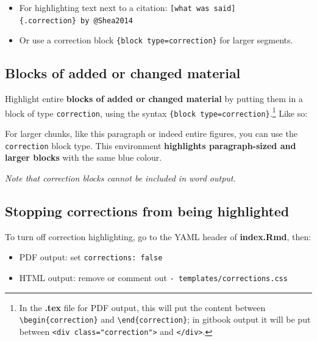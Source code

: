 \documentclass[a4paper, nobind]{templates/ociamthesis}
\providecommand{\tightlist}{%
  \setlength{\itemsep}{0pt}\setlength{\parskip}{0pt}}
\begin{document}
\begin{itemize}
\tightlist
\item
  For highlighting text next to a citation: \texttt{{[}what\ was\ said{]}\{.correction\}\ by\ @Shea2014}
\item
  Or use a correction block \texttt{\textasciigrave{}\textasciigrave{}\textasciigrave{}\{block\ type=\textquotesingle{}correction\textquotesingle{}\}} for larger segments.
\end{itemize}

\subsection{Blocks of added or changed material}\label{blocks-of-added-or-changed-material}

Highlight entire \textbf{blocks of added or changed material} by putting them in a block of type \texttt{correction}, using the syntax \texttt{\textasciigrave{}\textasciigrave{}\textasciigrave{}\{block\ type=\textquotesingle{}correction\textquotesingle{}\}}.\footnote{In the \textbf{.tex} file for PDF output, this will put the content between \texttt{\textbackslash{}begin\{correction\}} and \texttt{\textbackslash{}end\{correction\}}; in gitbook output it will be put between \texttt{\textless{}div\ class="correction"\textgreater{}} and \texttt{\textless{}/div\textgreater{}}.}
Like so:

\begin{correction}
For larger chunks, like this paragraph or indeed entire figures, you can
use the \texttt{correction} block type. This environment
\textbf{highlights paragraph-sized and larger blocks} with the same blue
colour.
\end{correction}

\emph{Note that correction blocks cannot be included in word output.}

\subsection{Stopping corrections from being highlighted}\label{stopping-corrections-from-being-highlighted}

To turn off correction highlighting, go to the YAML header of \textbf{index.Rmd}, then:

\begin{itemize}
\tightlist
\item
  PDF output: set \texttt{corrections:\ false}\\
\item
  HTML output: remove or comment out \texttt{-\ templates/corrections.css}
\end{itemize}
\end{document}

